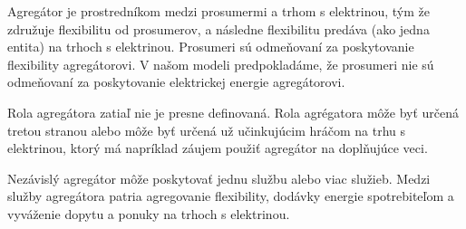 Agregátor je prostredníkom medzi prosumermi a trhom s elektrinou, tým že združuje flexibilitu od prosumerov, a následne flexibilitu predáva (ako jedna entita) na trhoch s elektrinou. Prosumeri sú odmeňovaní za poskytovanie flexibility agregátorovi. V našom modeli predpokladáme, že prosumeri nie sú odmeňovaní za poskytovanie elektrickej energie agregátorovi.



Rola agregátora zatiaľ nie je presne definovaná. Rola agrégatora môže byť určená tretou stranou alebo môže byť určená už učinkujúcim hráčom na trhu s elektrinou, ktorý má napríklad záujem použiť agregátor na doplňujúce veci.

Nezávislý agregátor môže poskytovať jednu službu alebo viac služieb. Medzi služby agregátora patria agregovanie flexibility, dodávky energie spotrebiteľom a vyváženie dopytu a ponuky na trhoch s elektrinou. \cite{Granado2023}



















